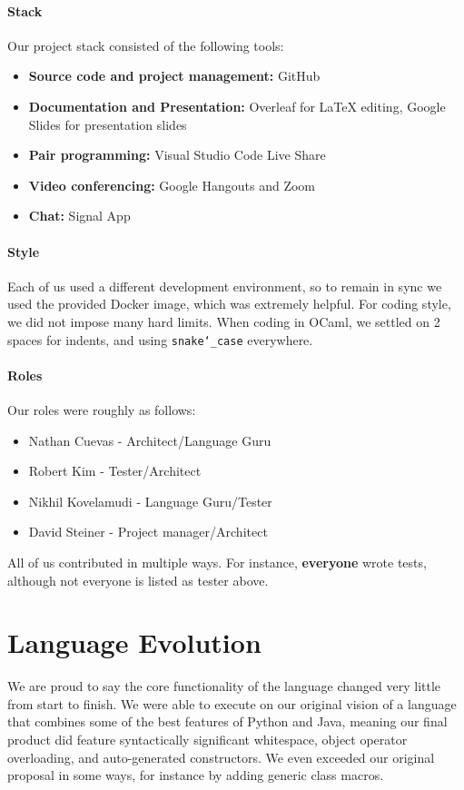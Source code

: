 \documentclass{article}
\begin{document}
\paragraph{Stack} Our project stack consisted of the following tools:
\begin{itemize}
\item \textbf{Source code and project management:} GitHub
\item \textbf{Documentation and Presentation:} Overleaf for LaTeX editing, Google Slides for presentation slides
\item \textbf{Pair programming:} Visual Studio Code Live Share
\item \textbf{Video conferencing:} Google Hangouts and Zoom
\item \textbf{Chat:} Signal App
\end{itemize}

\paragraph{Style} Each of us used a different development environment, so to remain in sync we used the provided Docker image, which was extremely helpful. For coding style, we did not impose many hard limits. When coding in OCaml, we settled on 2 spaces for indents, and using \texttt{snake\char`_case} everywhere. 

\paragraph{Roles} Our roles were roughly as follows:
\begin{itemize}
    \item Nathan Cuevas - Architect/Language Guru
    \item Robert Kim - Tester/Architect
    \item Nikhil Kovelamudi - Language Guru/Tester
    \item David Steiner - Project manager/Architect
\end{itemize}
All of us contributed in multiple ways. For instance, \textbf{everyone} wrote tests, although not everyone is listed as tester above.

\section{Language Evolution}
We are proud to say the core functionality of the language changed very little from start to finish. We were able to execute on our original vision of a language that combines some of the best features of Python and Java, meaning our final product did feature syntactically significant whitespace, object operator overloading, and auto-generated constructors. We even exceeded our original proposal in some ways, for instance by adding generic class macros.
\end{document}
